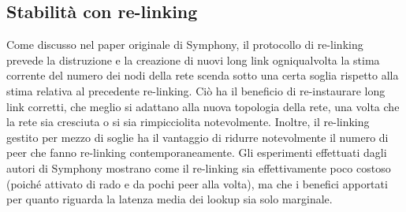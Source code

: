 \documentclass[prodmode,acmtap]{acmlarge}
\begin{document}
\subsection{Stabilità con re-linking}
Come discusso nel paper originale di Symphony, il protocollo di re-linking prevede la distruzione e la creazione di nuovi long link ogniqualvolta la stima corrente del numero dei nodi della rete scenda sotto una certa soglia rispetto alla stima relativa al precedente re-linking. Ciò ha il beneficio di re-instaurare long link corretti, che meglio si adattano alla nuova topologia della rete, una volta che la rete sia cresciuta o si sia rimpicciolita notevolmente. Inoltre, il re-linking gestito per mezzo di soglie ha il vantaggio di ridurre notevolmente il numero di peer che fanno re-linking contemporaneamente. Gli esperimenti effettuati dagli autori di Symphony mostrano come il re-linking sia effettivamente poco costoso (poiché attivato di rado e da pochi peer alla volta), ma che i benefici apportati per quanto riguarda la latenza media dei lookup sia solo marginale.
\end{document}
